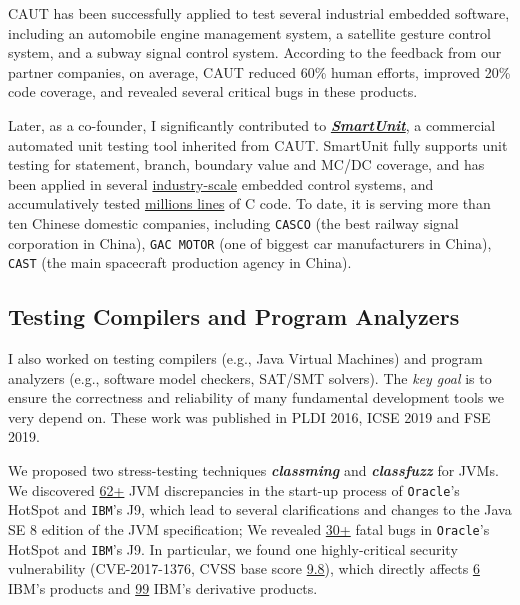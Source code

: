 \documentclass[a4paper]{article}
\begin{document}
CAUT has been successfully applied to test several industrial embedded software, including an automobile engine management system, a satellite gesture control system, and a subway signal control system.  According to the feedback from our partner companies, on average, CAUT reduced 60\% human efforts, improved 20\% code coverage, and revealed several critical bugs in these products. 

Later, as a co-founder, I significantly contributed to \textbf{\emph{\href{http://180.167.177.62:1111}{SmartUnit}}}, a commercial automated unit testing tool inherited from CAUT. SmartUnit fully supports unit testing for statement, branch, boundary value and MC/DC coverage, and has been applied in several \underline{industry-scale} embedded control systems, and accumulatively tested \underline{millions lines} of C code.  
To date, it is serving more than ten Chinese domestic companies, including \texttt{CASCO} (the best railway signal
corporation in China), \texttt{GAC MOTOR} (one of biggest car manufacturers in China), \texttt{CAST} (the main spacecraft production agency in China). 

\subsection{Testing Compilers and Program Analyzers}
\label{testing_analyzers}

I also worked on testing compilers (e.g., Java Virtual Machines) and program analyzers (e.g., software model checkers, SAT/SMT solvers). The \emph{key goal} is to ensure the correctness and reliability of many fundamental development tools we very depend on. These work was published in PLDI 2016, ICSE 2019 and FSE 2019.

We proposed two stress-testing techniques \emph{\textbf{classming}} and \emph{\textbf{classfuzz}} for JVMs. We discovered \underline{62+} JVM discrepancies in the start-up process of \texttt{Oracle}'s HotSpot and \texttt{IBM}'s J9, which lead to  several clarifications and changes to the Java SE 8 edition of the JVM specification; We revealed \underline{30+} fatal bugs in \texttt{Oracle}'s HotSpot and \texttt{IBM}'s J9. In particular, we found one highly-critical security vulnerability (CVE-2017-1376, CVSS base score \underline{9.8}), which directly affects \underline{6} IBM's products and \underline{99} IBM's derivative products.
\end{document}
